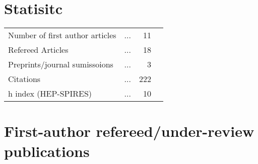 \documentclass[10pt,floatfix,a4paper]{article}
\begin{document}
\section*{Statisitc}
\begin{tabular}{ l l r l}
	Number of first author articles 	& ... & 11 \\
	Refereed Articles 					& ... & 18 \\
	Preprints/journal sumissoions 		& ... & 3  \\
	Citations 		& ... & 222 \\
	h index (HEP-SPIRES) 				& ... & 10 \\
\end{tabular}

\section*{First-author refereed/under-review publications}
\end{document}
